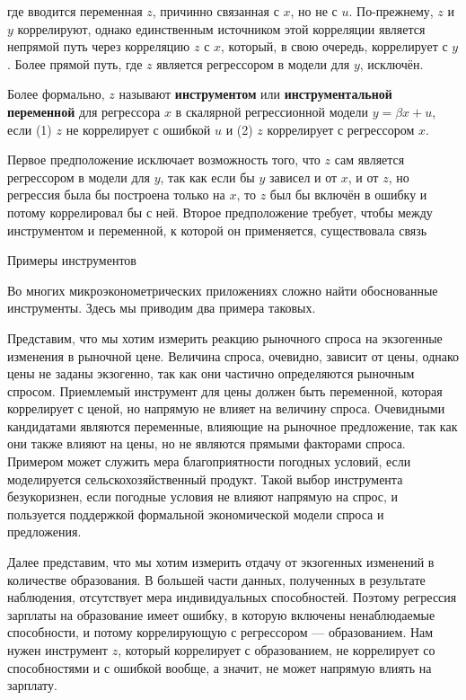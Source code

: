 \vspace{4cm}
\begin{figure}
\end{figure}
где вводится переменная $z$, причинно связанная с $x$, но не с $u$. По-прежнему, $z$ и $y$  коррелируют, однако единственным источником этой корреляции является непрямой путь через корреляцию $z$ с $x$, который, в свою очередь, коррелирует с $y$. Более прямой путь, где $z$ является регрессором в модели для $y$, исключён.

Более формально, $z$ называют \textbf{инструментом} или \textbf{инструментальной переменной}   для регрессора $x$ в скалярной регрессионной модели $y = \beta x +u $, если (1) $z$ не коррелирует с ошибкой $u$ и (2) $z$ коррелирует с регрессором $x$.

Первое предположение исключает возможность того, что $z$ сам является регрессором в модели для $y$, так как если бы $y$ зависел и от $x$, и от $z$, но регрессия была бы построена только на $x$, то $z$ был бы включён в ошибку и потому коррелировал бы с ней.  Второе предположение требует, чтобы между инструментом и переменной, к которой он применяется, существовала связь
\begin{center}
Примеры инструментов
\end{center}
Во многих микроэконометрических приложениях сложно найти обоснованные инструменты. Здесь мы приводим два примера таковых.

Представим, что мы хотим измерить реакцию рыночного спроса на экзогенные изменения в рыночной цене. Величина спроса, очевидно, зависит от цены, однако цены не заданы экзогенно, так как они частично определяются рыночным спросом. Приемлемый инструмент для цены должен быть переменной, которая коррелирует с ценой, но напрямую не влияет на величину спроса. Очевидными кандидатами являются переменные, влияющие на рыночное предложение, так как они также влияют на цены, но не являются прямыми факторами спроса. Примером может служить мера благоприятности погодных условий, если моделируется сельскохозяйственный продукт. Такой выбор инструмента безукоризнен, если погодные условия не влияют напрямую на спрос, и пользуется поддержкой формальной экономической модели спроса и предложения.

Далее представим, что мы хотим измерить отдачу от экзогенных изменений в количестве образования. В большей части данных, полученных в результате наблюдения, отсутствует мера индивидуальных способностей. Поэтому регрессия зарплаты на образование имеет ошибку, в которую включены ненаблюдаемые способности, и потому коррелирующую с регрессором --- образованием. Нам нужен инструмент $z$, который коррелирует с образованием, не коррелирует со способностями и с ошибкой вообще, а значит, не может напрямую влиять на зарплату.

